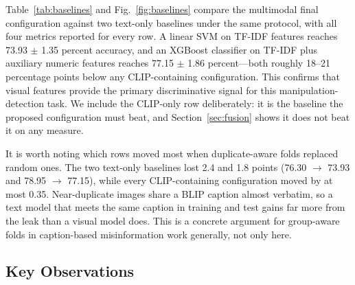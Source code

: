 \documentclass[conference,a4paper]{IEEEtran}
\begin{document}
Table~\ref{tab:baselines} and Fig.~\ref{fig:baselines} compare the multimodal
final configuration against two text-only baselines under the same protocol,
with all four metrics reported for every row. A linear SVM on TF-IDF features
reaches 73.93 $\pm$ 1.35 percent accuracy, and an XGBoost classifier on TF-IDF
plus auxiliary numeric features reaches 77.15 $\pm$ 1.86 percent---both
roughly 18--21 percentage points below any CLIP-containing configuration. This
confirms that visual features provide the primary discriminative signal for
this manipulation-detection task. We include the CLIP-only row deliberately:
it is the baseline the proposed configuration must beat, and
Section~\ref{sec:fusion} shows it does not beat it on any measure.

It is worth noting which rows moved most when duplicate-aware folds replaced
random ones. The two text-only baselines lost 2.4 and 1.8 points
(76.30 $\rightarrow$ 73.93 and 78.95 $\rightarrow$ 77.15), while every
CLIP-containing configuration moved by at most 0.35. Near-duplicate images
share a BLIP caption almost verbatim, so a text model that meets the same
caption in training and test gains far more from the leak than a visual model
does. This is a concrete argument for group-aware folds in caption-based
misinformation work generally, not only here.

\subsection{Key Observations}
\end{document}
